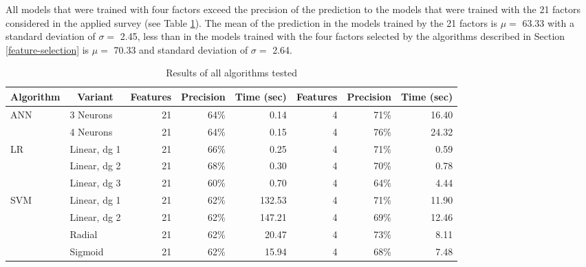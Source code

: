 \documentclass[]{book}
\begin{document}
All models that were trained with four factors exceed the precision of
the prediction to the models that were trained with the 21 factors
considered in the applied survey (see Table
\ref{tab:results-of-all-algoritms}). The mean of the prediction in the
models trained by the 21 factors is \(\mu=\) 63.33 with a standard
deviation of \(\sigma=\) 2.45, less than in the models trained with the
four factors selected by the algorithms described in Section
\ref{feature-selection} is \(\mu=\) 70.33 and standard deviation of
\(\sigma =\) 2.64.

\begin{table}[ht]
    \centering
    \caption{Results of all algorithms tested}
    \label{tab:results-of-all-algoritms}
    \begin{tabular}{llrrrrrr}
        \hline
        \multicolumn{1}{c}{\textbf{Algorithm}}  & \multicolumn{1}{c}{\textbf{Variant}} & \multicolumn{1}{p{1.5cm}}{\textbf{Features}} & \multicolumn{1}{c}{\textbf{Precision}} & \multicolumn{1}{p{1cm}}{\textbf{Time (sec)}} & \multicolumn{1}{p{1.5cm}}{\textbf{Features}} & \textbf{Precision} & \multicolumn{1}{p{1cm}}{\textbf{Time (sec)}} \\ \hline
        \multirow{2}{*}{ANN} & 3 Neurons    & 21  & 64\%  & 0.14   & 4  & 71\%   & 16.40   \\
                             & 4 Neurons    & 21  & 64\%  & 0.15   & 4  & 76\%   & 24.32    \\ \hline
        \multirow{3}{*}{LR}  & Linear, dg 1 & 21  & 66\%  & 0.25   & 4  & 71\%   & 0.59      \\
                             & Linear, dg 2 & 21  & 68\%  & 0.30   & 4  & 70\%   & 0.78       \\
                             & Linear, dg 3 & 21  & 60\%  & 0.70   & 4  & 64\%   & 4.44       \\ \hline
        \multirow{4}{*}{SVM} & Linear, dg 1 & 21  & 62\%  & 132.53 & 4  & 71\%   & 11.90      \\
                             & Linear, dg 2 & 21  & 62\%  & 147.21 & 4  & 69\%   & 12.46   \\
                             & Radial       & 21  & 62\%  & 20.47  & 4  & 73\%   & 8.11    \\
                             & Sigmoid      & 21  & 62\%  & 15.94  & 4  & 68\%   & 7.48   \\ \hline
    \end{tabular}
\end{table}
\end{document}
